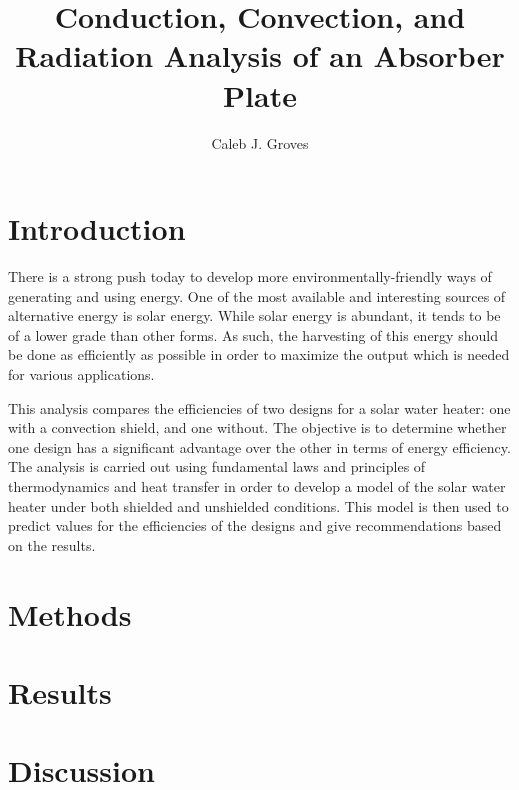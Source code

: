 \documentclass[]{report}
\title{Conduction, Convection, and Radiation Analysis of an Absorber Plate}
\author{Caleb J. Groves}
\begin{document}
\maketitle

\begin{abstract}
\end{abstract}

\section{Introduction}

There is a strong push today to develop more environmentally-friendly ways of generating and using energy. One of the most available and interesting sources of alternative energy is solar energy. While solar energy is abundant, it tends to be of a lower grade than other forms. As such, the harvesting of this energy should be done as efficiently as possible in order to maximize the output which is needed for various applications.

This analysis compares the efficiencies of two designs for a solar water heater: one with a convection shield, and one without. The objective is to determine whether one design has a significant advantage over the other in terms of energy efficiency. The analysis is carried out using fundamental laws and principles of thermodynamics and heat transfer in order to develop a model of the solar water heater under both shielded and unshielded conditions. This model is then used to predict values for the efficiencies of the designs and give recommendations based on the results.

\section{Methods}

\section{Results}

\section{Discussion}
\end{document}
